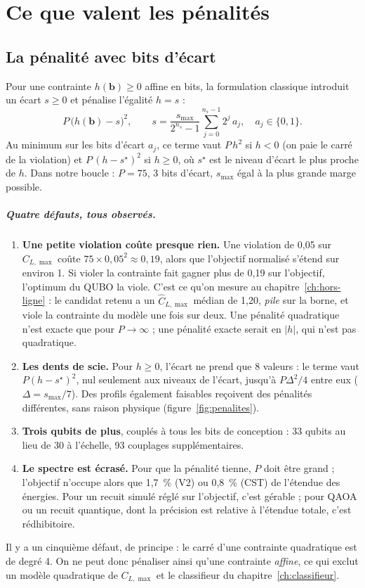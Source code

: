 \chapter{Ce que valent les pénalités}\label{ch:penalites}

\section{La pénalité avec bits d'écart}
Pour une contrainte $h(\mathbf b)\ge0$ affine en bits, la formulation classique introduit un écart $s\ge0$ et pénalise l'égalité $h=s$ :
\[ P\,\big(h(\mathbf b)-s\big)^2,\qquad s=\frac{s_{\max}}{2^{n_s}-1}\sum_{j=0}^{n_s-1}2^j\,a_j,\quad a_j\in\{0,1\}. \]
Au minimum sur les bits d'écart $a_j$, ce terme vaut $P\,h^2$ si $h<0$ (on paie le carré de la violation) et $P\,(h-s^\star)^2$ si $h\ge0$, où $s^\star$ est le niveau d'écart le plus proche de $h$. Dans notre boucle : $P=75$, 3 bits d'écart, $s_{\max}$ égal à la plus grande marge possible.

\paragraph{Quatre défauts, tous observés.}
\begin{enumerate}
\item \textbf{Une petite violation coûte presque rien.} Une violation de 0,05 sur $C_{L,\max}$ coûte $75\times0{,}05^2\approx0{,}19$, alors que l'objectif normalisé s'étend sur environ 1. Si violer la contrainte fait gagner plus de 0,19 sur l'objectif, l'optimum du QUBO la viole. C'est ce qu'on mesure au chapitre~\ref{ch:hors-ligne} : le candidat retenu a un $\hat C_{L,\max}$ médian de 1,20, \emph{pile} sur la borne, et viole la contrainte du modèle une fois sur deux. Une pénalité quadratique n'est exacte que pour $P\to\infty$ ; une pénalité exacte serait en $|h|$, qui n'est pas quadratique.
\item \textbf{Les dents de scie.} Pour $h\ge0$, l'écart ne prend que 8 valeurs : le terme vaut $P(h-s^\star)^2$, nul seulement aux niveaux de l'écart, jusqu'à $P\Delta^2/4$ entre eux ($\Delta=s_{\max}/7$). Des profils également faisables reçoivent des pénalités différentes, sans raison physique (figure~\ref{fig:penalites}).
\item \textbf{Trois qubits de plus}, couplés à tous les bits de conception : 33 qubits au lieu de 30 à l'échelle, 93 couplages supplémentaires.
\item \textbf{Le spectre est écrasé.} Pour que la pénalité tienne, $P$ doit être grand ; l'objectif n'occupe alors que 1,7~\% (V2) ou 0,8~\% (CST) de l'étendue des énergies. Pour un recuit simulé réglé sur l'objectif, c'est gérable ; pour QAOA ou un recuit quantique, dont la précision est relative à l'étendue totale, c'est rédhibitoire.
\end{enumerate}
Il y a un cinquième défaut, de principe : le carré d'une contrainte quadratique est de degré 4. On ne peut donc pénaliser ainsi qu'une contrainte \emph{affine}, ce qui exclut un modèle quadratique de $C_{L,\max}$ et le classifieur du chapitre~\ref{ch:classifieur}.

